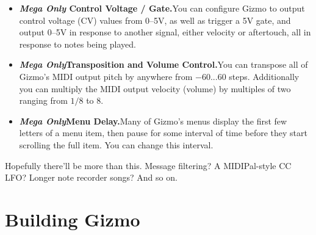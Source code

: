 \documentclass{article}
\begin{document}
\begin{itemize}
\item {\bf  \textit{Mega Only} Control Voltage / Gate.}\quad You can configure Gizmo to output control voltage (CV) values from 0--5V, as well as trigger a 5V gate, and output 0--5V in response to another signal, either velocity or aftertouch, all in response to notes being played. 

\item {\bf \textit{Mega Only}\quad Transposition and Volume Control.}\quad You can transpose all of Gizmo's MIDI output pitch by anywhere from \(-60...60\) steps.  Additionally you can multiply the MIDI output velocity (volume) by multiples of two ranging from \(1/8\) to \(8\).

\item {\bf \textit{Mega Only}\quad Menu Delay.}\quad Many of Gizmo's menus display the first few letters of a menu item, then pause for some interval of time before they start scrolling the full item.  You can change this interval.

\end{itemize} 

Hopefully there'll be more than this.  Message filtering?  A MIDIPal-style CC LFO?  Longer note recorder songs?  And so on.

\clearpage

\section{Building Gizmo}
\end{document}
